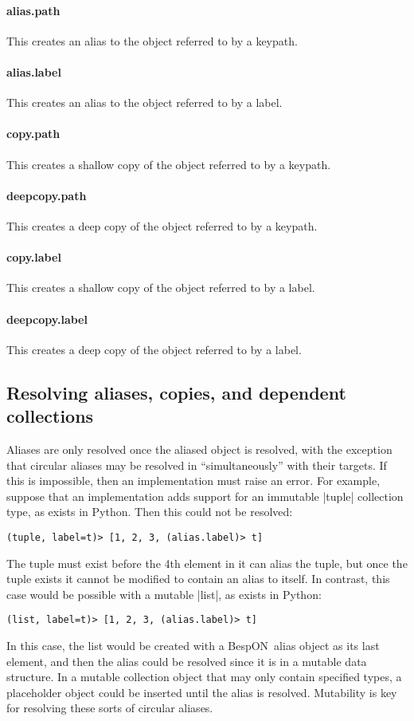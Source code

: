 \documentclass[11pt]{article}
\newcommand{\bespon}{BespON}
\begin{document}
{{\paragraph{alias.path}
This creates an alias to the object referred to by a keypath.

\paragraph{alias.label}
This creates an alias to the object referred to by a label.

\paragraph{copy.path}
This creates a shallow copy of the object referred to by a keypath.

\paragraph{deepcopy.path}
This creates a deep copy of the object referred to by a keypath.

\paragraph{copy.label}
This creates a shallow copy of the object referred to by a label.

\paragraph{deepcopy.label}
This creates a deep copy of the object referred to by a label.




\subsection{Resolving aliases, copies, and dependent collections}

Aliases are only resolved once the aliased object is resolved, with the exception that circular aliases may be resolved in ``simultaneously'' with their targets.  If this is impossible, then an implementation must raise an error.  For example, suppose that an implementation adds support for an immutable |tuple| collection type, as exists in Python.  Then this could not be resolved:
\begin{Verbatim}
(tuple, label=t)> [1, 2, 3, (alias.label)> t]
\end{Verbatim}
The tuple must exist before the 4th element in it can alias the tuple, but once the tuple exists it cannot be modified to contain an alias to itself.  In contrast, this case would be possible with a mutable |list|, as exists in Python:
\begin{Verbatim}
(list, label=t)> [1, 2, 3, (alias.label)> t]
\end{Verbatim}
In this case, the list would be created with a \bespon\ alias object as its last element, and then the alias could be resolved since it is in a mutable data structure.  In a mutable collection object that may only contain specified types, a placeholder object could be inserted until the alias is resolved.  Mutability is key for resolving these sorts of circular aliases.

}}
\end{document}
